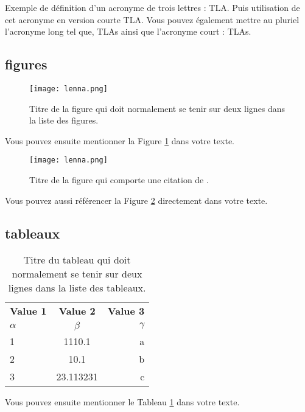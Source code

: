 Exemple de définition d'un acronyme de trois lettres : \ac{TLA}. Puis utilisation de cet acronyme en version courte \acs{TLA}. Vous pouvez également mettre au pluriel l'acronyme long tel que, \aclp{TLA} ainsi que l'acronyme court : \acsp{TLA}.

\subsection{figures}

\begin{figure}[H]
 \centering
 \texttt{[image: lenna.png]}
 \caption{Titre de la figure qui doit normalement se tenir sur deux lignes dans la liste des figures.}
 \label{fig:figure_long}
\end{figure}

Vous pouvez ensuite mentionner la Figure \ref{fig:figure_long} dans votre texte.

\begin{figure}[H]
  \centering
  \texttt{[image: lenna.png]}
  \caption[Titre de la figure sans citation]{Titre de la figure qui comporte une citation de \citet{RN6}.}
  \label{fig:figure_cite}
 \end{figure}

 Vous pouvez aussi référencer la Figure \ref{fig:figure_cite} directement dans votre texte.

\subsection{tableaux}

\begin{table}[H]
  \begin{center}
    \caption{Titre du tableau qui doit normalement se tenir sur deux lignes dans la liste des tableaux.}
    \label{tab:tab_1}
    \begin{tabular}{l|c|r}
      \textbf{Value 1} & \textbf{Value 2} & \textbf{Value 3}\\
      $\alpha$ & $\beta$ & $\gamma$ \\
      \hline
      1 & 1110.1 & a\\
      2 & 10.1 & b\\
      3 & 23.113231 & c\\
    \end{tabular}
  \end{center}
\end{table}

Vous pouvez ensuite mentionner le Tableau \ref{tab:tab_1} dans votre texte.
